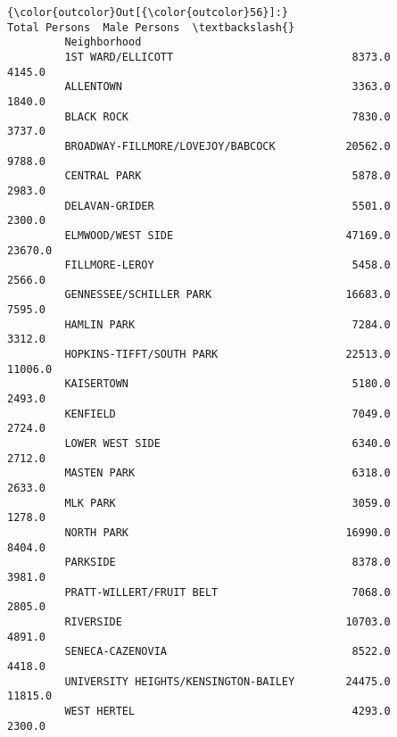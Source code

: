 \documentclass[11pt]{article}
\begin{document}
\begin{Verbatim}[commandchars=\\\{\}]
{\color{outcolor}Out[{\color{outcolor}56}]:}                                       Total Persons  Male Persons  \textbackslash{}
         Neighborhood                                                        
         1ST WARD/ELLICOTT                            8373.0        4145.0   
         ALLENTOWN                                    3363.0        1840.0   
         BLACK ROCK                                   7830.0        3737.0   
         BROADWAY-FILLMORE/LOVEJOY/BABCOCK           20562.0        9788.0   
         CENTRAL PARK                                 5878.0        2983.0   
         DELAVAN-GRIDER                               5501.0        2300.0   
         ELMWOOD/WEST SIDE                           47169.0       23670.0   
         FILLMORE-LEROY                               5458.0        2566.0   
         GENNESSEE/SCHILLER PARK                     16683.0        7595.0   
         HAMLIN PARK                                  7284.0        3312.0   
         HOPKINS-TIFFT/SOUTH PARK                    22513.0       11006.0   
         KAISERTOWN                                   5180.0        2493.0   
         KENFIELD                                     7049.0        2724.0   
         LOWER WEST SIDE                              6340.0        2712.0   
         MASTEN PARK                                  6318.0        2633.0   
         MLK PARK                                     3059.0        1278.0   
         NORTH PARK                                  16990.0        8404.0   
         PARKSIDE                                     8378.0        3981.0   
         PRATT-WILLERT/FRUIT BELT                     7068.0        2805.0   
         RIVERSIDE                                   10703.0        4891.0   
         SENECA-CAZENOVIA                             8522.0        4418.0   
         UNIVERSITY HEIGHTS/KENSINGTON-BAILEY        24475.0       11815.0   
         WEST HERTEL                                  4293.0        2300.0   
         

\end{Verbatim}
\end{document}
